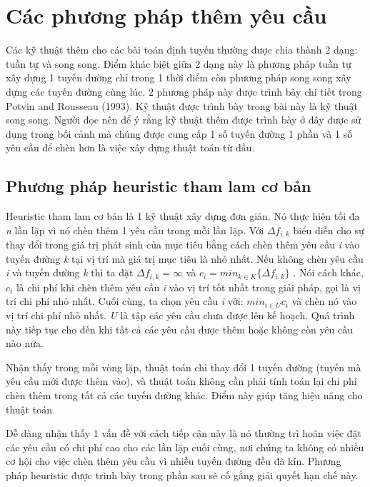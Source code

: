 \section{Các phương pháp thêm yêu cầu}
Các kỹ thuật thêm cho các bài toán định tuyến thường được chia thành 2 dạng: tuần tự và song song. Điểm khác biệt giữa 2 dạng này là phương pháp tuần tự xây dựng 1 tuyến đường chỉ trong 1 thời điểm còn phương pháp song song xây dựng các tuyến đường cùng lúc. 2 phương pháp này được trình bày chi tiết trong Potvin and Rousseau (1993). Kỹ thuật được trình bày trong bài này là kỹ thuật song song. Người đọc nên để ý rằng kỹ thuật thêm được trình bày ở đây được sử dụng trong bối cảnh mà chúng được cung cấp 1 số tuyến đường 1 phần và 1 số yêu cầu để chèn hơn là việc xây dựng thuật toán từ đầu.

\subsection{Phương pháp heuristic tham lam cơ bản}
Heuristic tham lam cơ bản là 1 kỹ thuật xây dựng đơn giản. Nó thực hiện tối đa \textit{n} lần lặp vì nó chèn thêm 1 yêu cầu trong mỗi lần lặp. Với $\Delta f_{i, k}$ biểu diễn cho sự thay đổi trong giá trị phát sinh của mục tiêu bằng cách chèn thêm yêu cầu \textit{i} vào tuyến đường \textit{k} tại vị trí mà giá trị mục tiêu là nhỏ nhất. Nếu không chèn yêu cầu \textit{i} và tuyến đường \textit{k} thì ta đặt $\Delta f_{i, k} = \infty$ và $c_i = min_{k \in K}\{\Delta f_{i, k}\}$ . Nói cách khác, $c_i$ là chi phí khi chèn thêm yêu cầu \textit{i} vào vị trí tốt nhất trong giải pháp, gọi là vị trí chi phí nhỏ nhất. Cuối cùng, ta chọn yêu cầu \textit{i} với: $min_{i \in U} c_i$ và chèn nó vào vị trí chi phí nhỏ nhất. \textit{U} là tập các yêu cầu chưa được lên kế hoạch. Quá trình này tiếp tục cho đến khi tất cả các yêu cầu được thêm hoặc không còn yêu cầu nào nữa.

Nhận thấy trong mỗi vòng lặp, thuật toán chỉ thay đổi 1 tuyến đường (tuyến mà yêu cầu mới được thêm vào), và thuật toán không cần phải tính toán lại chi phí chèn thêm trong tất cả các tuyến đường khác. Điểm này giúp tăng hiệu năng cho thuật toán.

Dễ dàng nhận thấy 1 vấn đề với cách tiếp cận này là nó thường trì hoãn việc đặt các yêu cầu có chi phí cao cho các lần lặp cuối cùng, nơi chúng ta không có nhiều cơ hội cho việc chèn thêm yêu cầu vì nhiều tuyến đường đều đã kín. Phương pháp heuristic được trình bày trong phần sau sẽ cố gắng giải quyết hạn chế này.

